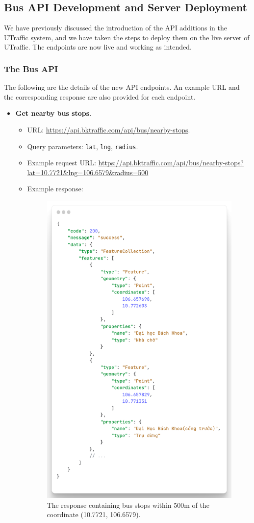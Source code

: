 \subsection{Bus API Development and Server Deployment}
We have previously discussed the introduction of the API additions in the UTraffic system, and we have taken the steps to deploy them on the live server of UTraffic. The endpoints are now live and working as intended.
\subsubsection{The Bus API}
The following are the details of the new API endpoints. An example URL and the corresponding response are also provided for each endpoint.

\begin{itemize}
    
    \item \textbf{Get nearby bus stops}.
    
    \begin{itemize}
        \item URL: \url{https://api.bktraffic.com/api/bus/nearby-stops}.
        \item Query parameters: \lstinline{lat}, \lstinline{lng}, \lstinline{radius}.
        \item Example request URL: \url{https://api.bktraffic.com/api/bus/nearby-stops?lat=10.7721&lng=106.6579&radius=500}
        \item Example response: 
        \begin{figure}[H]
            \centering
            \includegraphics[width=0.5\linewidth]{assets/images/Implementation/nearby_bus_response.png}
            \caption{The response containing bus stops within 500m of the coordinate (10.7721, 106.6579).}
            \label{fig:nearby_stop_response}
        \end{figure}
    \end{itemize}


\end{itemize}
